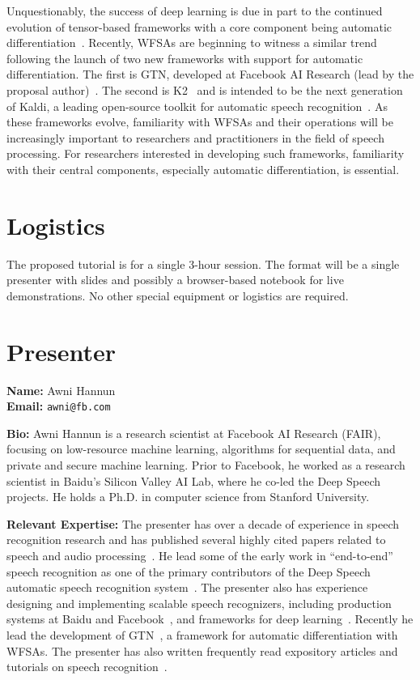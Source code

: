 \documentclass[11pt]{article}
\begin{document}
Unquestionably, the success of deep learning is due in part to the continued
evolution of tensor-based frameworks with a core component being automatic
differentiation~\cite{paszke2019pytorch, collobert2011torch7,
abadi2016tensorflow}. Recently, WFSAs are beginning to witness a similar trend
following the launch of two new frameworks with support for automatic
differentiation. The first is GTN, developed at Facebook AI Research (lead by
the proposal author)~\cite{gtn}. The second is K2~\cite{k2} and is intended to
be the next generation of Kaldi, a leading open-source toolkit for automatic
speech recognition~\cite{povey2011kaldi}. As these frameworks evolve,
familiarity with WFSAs and their operations will be increasingly important to
researchers and practitioners in the field of speech processing. For
researchers interested in developing such frameworks, familiarity with their
central components, especially automatic differentiation, is essential.

\section*{Logistics}

The proposed tutorial is for a single 3-hour session. The format will be a
single presenter with slides and possibly a browser-based notebook for live
demonstrations. No other special equipment or logistics are required.

\section*{Presenter}

{\bf Name:} Awni Hannun \\
{\bf Email:} \texttt{awni@fb.com}

{\bf Bio:} Awni Hannun is a research scientist at Facebook AI Research (FAIR),
focusing on low-resource machine learning, algorithms for sequential data, and
private and secure machine learning. Prior to Facebook, he worked as a research
scientist in Baidu's Silicon Valley AI Lab, where he co-led the Deep Speech
projects. He holds a Ph.D. in computer science from Stanford University.

{\bf Relevant Expertise:}
The presenter has over a decade of experience in speech recognition research
and has published several highly cited papers related to speech and audio
processing~\cite{hannun2014deep, maas2013, amodei2016deep}. He lead some of the
early work in ``end-to-end'' speech recognition as one of the primary
contributors of the Deep Speech automatic speech recognition
system~\cite{hannun2014deep}. The presenter also has experience designing and
implementing scalable speech recognizers, including production systems
at Baidu and Facebook~\cite{amodei2016deep, w2lcode, pratap2019}, and
frameworks for deep learning~\cite{flashlight}. Recently he lead the
development of GTN~\cite{gtn, hannun2020differentiable}, a framework for
automatic differentiation with WFSAs. The presenter has also written frequently
read expository articles and tutorials on speech
recognition~\cite{hannun2017sequence, awniblog}.
\end{document}
